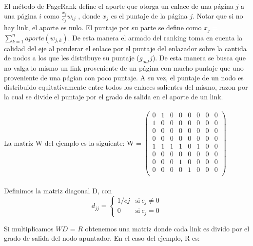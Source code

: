 El método de PageRank define el aporte que otorga un enlace de una página $j$ a una página $i$ como $\frac{x_{j}}{c_{j}} w_{ij}$ , donde $x_{j}$ es el puntaje de la página $j$. Notar que si no hay link, el aporte es nulo.
El puntaje por su parte se define como $x_{j}$ = $\sum_{k=1}^{n} aporte (w_{j,k})$. De esta manera el armado del ranking toma en cuenta la calidad del eje al ponderar el enlace por el puntaje del enlazador sobre la cantida de nodos a los que les distribuye su puntaje ($g_{out} j$). De esta manera se busca que no valga lo mismo un link proveniente de un página con mucho puntaje que uno proveniente de una págian con poco puntaje. A su vez, el puntaje de un nodo es distribuido equitativamente entre todos los enlaces salientes del mismo, razon por la cual se divide el puntaje por el grado de salida en el aporte de un link. \\ \\

La matriz W del ejemplo es la siguiente: W = 
$ \begin{pmatrix}
  0 & 1 & 0 & 0 & 0 & 0 & 0 & 0 \\
 1 & 0 & 0 & 0 & 0 & 0 & 0 & 0  \\
  0 & 0 & 0 & 0 & 0 & 0 & 0 & 0  \\
   0 & 0 & 0 & 0 & 0 & 0 & 0 & 0  \\
    1 & 1 & 1 & 1 & 0 & 1 & 0 & 0  \\
     0 & 0 & 0 & 0 & 0 & 0 & 0 & 0  \\
      0 & 0 & 0 & 1 & 0 & 0 & 0 & 0  \\
       0 & 0 & 0 & 0 & 1 & 0 & 0 & 0  \\
 \end{pmatrix}$ \\ \\ 
 
 Definimos la matriz diagonal D, con     
    \begin{equation*}
        d_{jj} = \left\{
                \begin{array}{ll}
                     1/cj & \mathrm{si\ } c_j \neq 0 \\
                     0    & \mathrm{si\ } c_j = 0
                \end{array}
            \right.
    \end{equation*} 

Si multiplicamos $WD$ = $R$ obtenemos una matriz donde cada link es divido por el grado de salida del nodo apuntador. En el caso del ejemplo, R es: \\ \\



